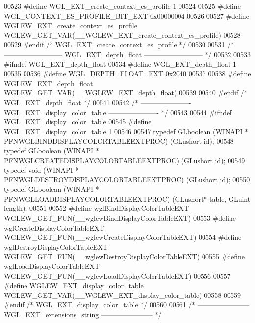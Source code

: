 \begin{DoxyCode}
00523 \textcolor{preprocessor}{#define WGL\_EXT\_create\_context\_es\_profile 1}
00524 
00525 \textcolor{preprocessor}{#define WGL\_CONTEXT\_ES\_PROFILE\_BIT\_EXT 0x00000004}
00526 
00527 \textcolor{preprocessor}{#define WGLEW\_EXT\_create\_context\_es\_profile WGLEW\_GET\_VAR(\_\_WGLEW\_EXT\_create\_context\_es\_profile)}
00528 
00529 \textcolor{preprocessor}{#endif }\textcolor{comment}{/* WGL\_EXT\_create\_context\_es\_profile */}\textcolor{preprocessor}{}
00530 
00531 \textcolor{comment}{/* -------------------------- WGL\_EXT\_depth\_float -------------------------- */}
00532 
00533 \textcolor{preprocessor}{#ifndef WGL\_EXT\_depth\_float}
00534 \textcolor{preprocessor}{#define WGL\_EXT\_depth\_float 1}
00535 
00536 \textcolor{preprocessor}{#define WGL\_DEPTH\_FLOAT\_EXT 0x2040}
00537 
00538 \textcolor{preprocessor}{#define WGLEW\_EXT\_depth\_float WGLEW\_GET\_VAR(\_\_WGLEW\_EXT\_depth\_float)}
00539 
00540 \textcolor{preprocessor}{#endif }\textcolor{comment}{/* WGL\_EXT\_depth\_float */}\textcolor{preprocessor}{}
00541 
00542 \textcolor{comment}{/* ---------------------- WGL\_EXT\_display\_color\_table ---------------------- */}
00543 
00544 \textcolor{preprocessor}{#ifndef WGL\_EXT\_display\_color\_table}
00545 \textcolor{preprocessor}{#define WGL\_EXT\_display\_color\_table 1}
00546 
00547 \textcolor{keyword}{typedef} GLboolean (WINAPI * PFNWGLBINDDISPLAYCOLORTABLEEXTPROC) (GLushort id);
00548 \textcolor{keyword}{typedef} GLboolean (WINAPI * PFNWGLCREATEDISPLAYCOLORTABLEEXTPROC) (GLushort id);
00549 \textcolor{keyword}{typedef} void (WINAPI * PFNWGLDESTROYDISPLAYCOLORTABLEEXTPROC) (GLushort id);
00550 \textcolor{keyword}{typedef} GLboolean (WINAPI * PFNWGLLOADDISPLAYCOLORTABLEEXTPROC) (GLushort* table, 
      GLuint length);
00551 
00552 \textcolor{preprocessor}{#define wglBindDisplayColorTableEXT WGLEW\_GET\_FUN(\_\_wglewBindDisplayColorTableEXT)}
00553 \textcolor{preprocessor}{#define wglCreateDisplayColorTableEXT WGLEW\_GET\_FUN(\_\_wglewCreateDisplayColorTableEXT)}
00554 \textcolor{preprocessor}{#define wglDestroyDisplayColorTableEXT WGLEW\_GET\_FUN(\_\_wglewDestroyDisplayColorTableEXT)}
00555 \textcolor{preprocessor}{#define wglLoadDisplayColorTableEXT WGLEW\_GET\_FUN(\_\_wglewLoadDisplayColorTableEXT)}
00556 
00557 \textcolor{preprocessor}{#define WGLEW\_EXT\_display\_color\_table WGLEW\_GET\_VAR(\_\_WGLEW\_EXT\_display\_color\_table)}
00558 
00559 \textcolor{preprocessor}{#endif }\textcolor{comment}{/* WGL\_EXT\_display\_color\_table */}\textcolor{preprocessor}{}
00560 
00561 \textcolor{comment}{/* ----------------------- WGL\_EXT\_extensions\_string ----------------------- */}

\end{DoxyCode}
